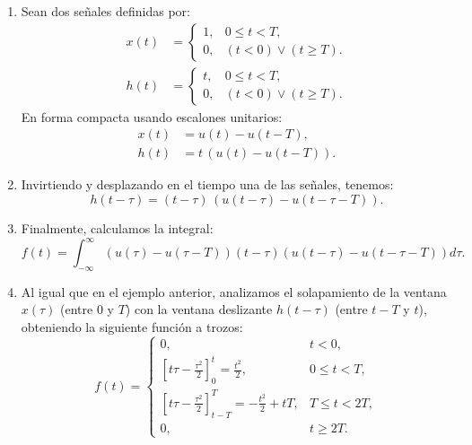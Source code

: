 \documentclass[11pt,a4paper,openany]{book}
\begin{document}
\begin{enumerate}
	
	\item Sean dos señales definidas por:
	\begin{align}
		x(t) &= \begin{cases}
			1, & 0 \leq t < T, \\ 
			0, & (t < 0) \lor (t \geq T).
		\end{cases} \\
		h(t) &= \begin{cases}
			t, & 0 \leq t < T, \\ 
			0, & (t < 0) \lor (t \geq T).
		\end{cases}
	\end{align}
	En forma compacta usando escalones unitarios:
	\begin{align}
		x(t) &= u(t) - u(t-T) , \\
		h(t) &= t \, (u(t) - u(t-T)) .
	\end{align}
	
	\item Invirtiendo y desplazando en el tiempo una de las señales, tenemos:
	\begin{equation}
		h(t-\tau) = (t-\tau) \, (u(t-\tau) - u(t-\tau -T)) .
	\end{equation}
	
	\item Finalmente, calculamos la integral:
	\begin{equation}
		f(t) = \int_{-\infty}^{\infty} \left( u(\tau) - u(\tau-T) \right) (t-\tau) \left( u(t-\tau) - u(t-\tau-T) \right) d\tau.
	\end{equation}
	
	\item Al igual que en el ejemplo anterior, analizamos el solapamiento de la ventana $x(\tau)$ (entre $0$ y $T$) con la ventana deslizante $h(t-\tau)$ (entre $t-T$ y $t$), obteniendo la siguiente función a trozos:
	\begin{equation}
		f(t) = \begin{cases}
			0, & t < 0, \\
			\left[ t \tau - \frac{\tau^2}{2} \right]_{0}^{t} = \frac{t^2}{2}, & 0 \leq t < T, \\
			\left[ t \tau - \frac{\tau^2}{2} \right]_{t-T}^{T} = -\frac{t^2}{2} + tT, & T \leq t < 2T, \\
			0, & t \geq 2T.
		\end{cases}
	\end{equation}
	
\end{enumerate}
\end{document}
